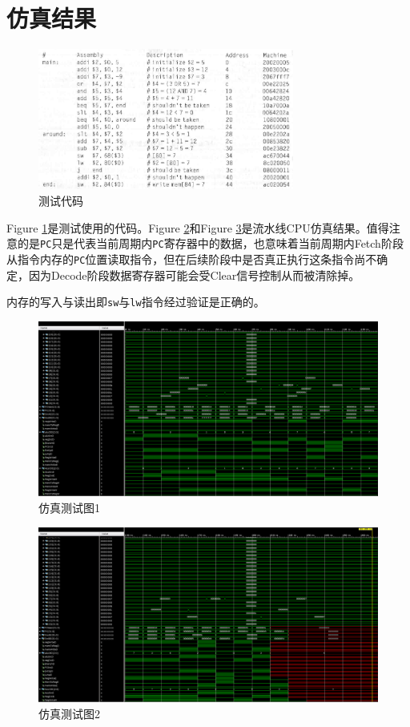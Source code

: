\documentclass[12pt,a4paper]{article}
\newcommand{\incode}[1]{\texttt{#1}} %
\begin{document}
\section{仿真结果}

\begin{figure}[htbp]
	\centering
	\includegraphics[width=0.75\textwidth]{code}
	\caption{测试代码}
	\label{fig:code}
\end{figure}

Figure \ref{fig:code}是测试使用的代码。Figure \ref{fig:sim1}和Figure \ref{fig:sim2}是流水线CPU仿真结果。值得注意的是\incode{PC}只是代表当前周期内\incode{PC}寄存器中的数据，也意味着当前周期内Fetch阶段从指令内存的\incode{PC}位置读取指令，但在后续阶段中是否真正执行这条指令尚不确定，因为Decode阶段数据寄存器可能会受Clear信号控制从而被清除掉。

内存的写入与读出即\incode{sw}与\incode{lw}指令经过验证是正确的。

\begin{figure}[htbp]
	\centering
	\includegraphics[width=\textwidth]{sim1}
	\caption{仿真测试图1}
	\label{fig:sim1}
\end{figure}

\begin{figure}[htbp]
	\centering
	\includegraphics[width=\textwidth]{sim2}
	\caption{仿真测试图2}
	\label{fig:sim2}
\end{figure}
\end{document}
